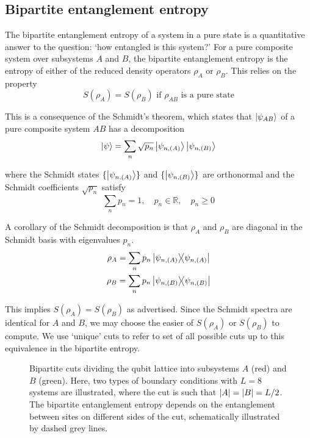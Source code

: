 \documentclass[10pt]{article}
\begin{document}
\subsection{Bipartite entanglement entropy}

The bipartite entanglement entropy of a system in a pure state is a quantitative answer to the question: `how entangled is this system?' For a pure composite system over subsystems $A$ and $B$, the bipartite entanglement entropy is the entropy of either of the reduced density operators $\rho_A$ or $\rho_B$. This relies on the property
\begin{equation}
S(\rho_A)=S(\rho_B) \text{ if } \rho_{AB} \text{ is a pure state}
\end{equation}

This is a consequence of the Schmidt's theorem, which states that $\ket{\psi_{AB}}$ of a pure composite system $AB$ has a decomposition
\begin{equation}
\ket{\psi} = \sum_n \sqrt{p_n} \ket{\psi_{n, (A)}} \ket{\psi_{n, (B)}}
\end{equation}

where the Schmidt states $\{\ket{\psi_{n, (A)}}\}$ and $\{\ket{\psi_{n, (B)}}\}$ are orthonormal and the Schmidt coefficients $\sqrt{p_n}$ satisfy
\begin{equation}
\sum_n p_n = 1,
\quad
p_n \in \mathbb{R},
\quad
p_n \geq 0
\end{equation}

A corollary of the Schmidt decomposition is that $\rho_A$ and $\rho_B$ are diagonal in the Schmidt basis with eigenvalues $p_n$.
\begin{gather}
\rho_A = \sum_n p_n \dyad{\psi_{n,(A)}} \\
\rho_B = \sum_n p_n \dyad{\psi_{n,(B)}}
\end{gather}

This implies $S(\rho_A)=S(\rho_B)$ as advertised. Since the Schmidt spectra are identical for $A$ and $B$, we may choose the easier of $S(\rho_A)$ or $S(\rho_B)$ to compute. We use `unique' cuts to refer to set of all possible cuts up to this equivalence in the bipartite entropy.

\begin{figure}
\caption{Bipartite cuts dividing the qubit lattice into subsystems $A$ (red) and $B$ (green). Here, two types of boundary conditions with $L=8$ systems are illustrated, where the cut is such that $\abs{A}=\abs{B}=L/2$. The bipartite entanglement entropy depends on the entanglement between sites on different sides of the cut, schematically illustrated by dashed grey lines.}
\label{fig_bipartition}
\end{figure}
\end{document}
